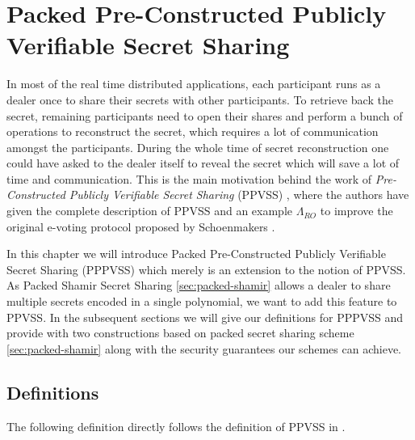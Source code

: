 \chapter{Packed Pre-Constructed Publicly Verifiable Secret Sharing}
\label{cha:3}
In most of the real time distributed applications, each participant runs as a dealer once to share their 
secrets with other participants. To retrieve back the secret, remaining participants need to open their 
shares and perform a bunch of operations to reconstruct the secret, which requires a lot of communication 
amongst the participants. During the whole time of secret reconstruction one could have asked to the dealer 
itself to reveal the secret which will save a lot of time and communication. This is the main motivation 
behind the work of \textit{Pre-Constructed Publicly Verifiable Secret Sharing} (PPVSS) \cite{cryptoeprint:2025/576}, 
where the authors have given the complete description of PPVSS and an example $\Lambda_{RO}$ to improve 
the original e-voting protocol proposed by Schoenmakers \cite{5581ccd9530540479539d21d1d39ae96}.\par

In this chapter we will introduce Packed Pre-Constructed Publicly Verifiable Secret Sharing (PPPVSS) which merely 
is an extension to the notion of PPVSS. As Packed Shamir Secret Sharing \ref{sec:packed-shamir} allows a 
dealer to share multiple secrets encoded in a single polynomial, we want to add this feature to PPVSS. In the 
subsequent sections we will give our definitions for PPPVSS and provide with two constructions based on packed secret sharing 
scheme \ref{sec:packed-shamir} along with the security guarantees our schemes can achieve.\par

\section{Definitions}
\label{sec:pppvss-definitions}

The following definition directly follows the definition of PPVSS in \cite{cryptoeprint:2025/576}.

